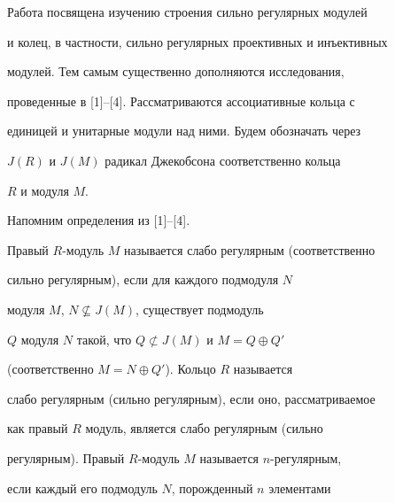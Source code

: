 \date{}







\pagestyle{plain} %













\maketitle





Работа посвящена изучению строения сильно регулярных модулей


и колец, в частности, сильно регулярных проективных и инъективных


модулей. Тем самым существенно дополняются исследования,


проведенные в [1]--[4]. Рассматриваются ассоциативные кольца с


единицей и унитарные модули над ними. Будем обозначать через


$J(R)$ и $J(M)$ радикал Джекобсона соответственно кольца


$R$ и модуля $M$.





Напомним определения из [1]--[4].


Правый $R$-модуль $M$ называется слабо регулярным (соответственно


сильно регулярным), если для каждого подмодуля $N$


модуля $M$, $N \nsubseteq J(M)$, существует подмодуль


$Q$ модуля $N$ такой, что $Q \not\subset J(M)$ и $M=Q \oplus Q'$


(соответственно $M=N \oplus Q'$). Кольцо $R$ называется


слабо регулярным (сильно регулярным), если оно, рассматриваемое


как правый $R$ модуль, является слабо регулярным (сильно


регулярным). Правый $R$-модуль $M$ называется $n$-регулярным,


если каждый его подмодуль $N$, порожденный $n$ элементами


